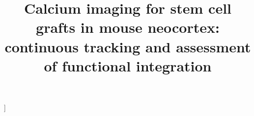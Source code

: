 \title{Calcium imaging for stem cell grafts in mouse neocortex: continuous tracking and assessment of functional integration}
]